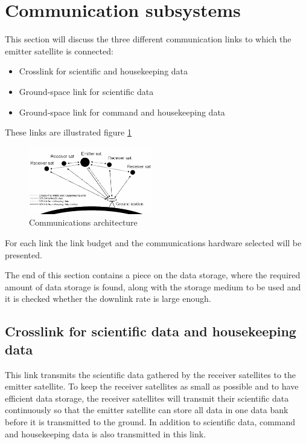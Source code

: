 
\section{Communication subsystems}
This section will discuss the  three different communication links to which the emitter satellite is connected:
\begin{itemize}
\item Crosslink for scientific and housekeeping data
\item Ground-space link for scientific data
\item Ground-space link for command and housekeeping data
\end{itemize}

These links are illustrated figure \ref{fig:allesZW}

\begin{figure}
\vspace{-60pt}
  \begin{center}
    \includegraphics[width=0.48\textwidth]{chapters/img/allesZW.png}
  \end{center}
  \vspace{-15pt}
  \caption{Communications architecture}
  \vspace{-30pt}
  \label{fig:allesZW}
\end{figure}

For each link the link budget and the communications hardware selected will be presented.

The end of this section contains a piece on the data storage, where the required amount of data storage is found, along with the storage medium to be used and it is checked whether the downlink rate is large enough.


\subsection{Crosslink for scientific data and housekeeping data}
\label{Crossem}
This link transmits the scientific data gathered by the receiver satellites to the emitter satellite. To keep the receiver satellites as small as possible and to have efficient data storage, the receiver satellites will transmit their scientific data continuously so that the emitter satellite can store all data in one data bank before it is transmitted to the ground. In addition to scientific data, command and housekeeping data is also transmitted in this link.

